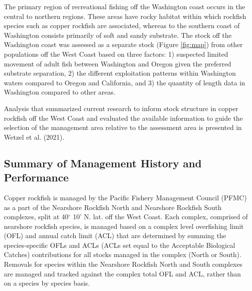 \documentclass[11pt,
  english,
  a4paper,
]{article}
\begin{document}

The primary region of recreational fishing off the Washington coast occurs in the central to northern regions. These areas have rocky habitat within which rockfish species such as copper rockfish are associated, whereas to the southern coast of Washington consists primarily of soft and sandy substrate. The stock off the Washington coast was assessed as a separate stock (Figure \ref{fig:map}) from other populations off the West Coast based on three factors: 1) suspected limited movement of adult fish between Washington and Oregon given the preferred substrate separation, 2) the different exploitation patterns within Washington waters compared to Oregon and California, and 3) the quantity of length data in Washington compared to other areas.

\leavevmode\tagmcend\tagstructend\par


Analysis that summarized current research to inform stock structure in copper rockfish off the West Coast and evaluated the available information to guide the selection of the management area relative to the assessment area is presented in Wetzel et al. {(2021)\leavevmode\tagmcend\tagstructend}.

\leavevmode\tagmcend\tagstructend\par


\hypertarget{summary-of-management-history-and-performance}{%
\subsection{Summary of Management History and Performance}\label{summary-of-management-history-and-performance}}

\leavevmode\tagmcend\tagstructend


Copper rockfish is managed by the Pacific Fishery Management Council (PFMC) as a part of the Nearshore Rockfish North and Nearshore Rockfish South complexes, split at 40{\(^\circ\)\leavevmode\tagmcend\tagstructend} 10' N. lat. off the West Coast. Each complex, comprised of nearshore rockfish species, is managed based on a complex level overfishing limit (OFL) and annual catch limit (ACL) that are determined by summing the species-specific OFLs and ACLs (ACLs set equal to the Acceptable Biological Catches) contributions for all stocks managed in the complex (North or South). Removals for species within the Nearshore Rockfish North and South complexes are managed and tracked against the complex total OFL and ACL, rather than on a species by species basis.
\end{document}
